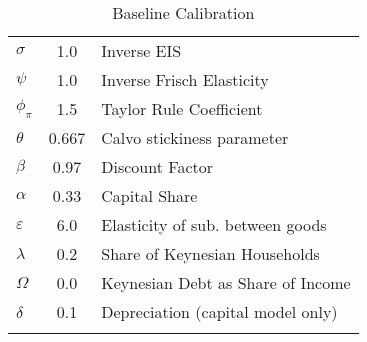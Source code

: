   \begin{table}
\begin{center}
    \caption{Baseline Calibration}\label{table:calibration}
\begin{tabular}{lcl}  
\\ \toprule  
$\sigma$ & 1.0 & Inverse EIS \\ 
$\psi$ & 1.0 & Inverse Frisch Elasticity \\ 
$\phi_{\pi}$ & 1.5 & Taylor Rule Coefficient \\ 
$\theta$ & 0.667 & Calvo stickiness parameter \\ 
$\beta$ & 0.97 &  Discount Factor\\ 
$\alpha$ & 0.33 &  Capital Share \\ 
$\varepsilon$ & 6.0 &  Elasticity of sub. between goods\\ 
$\lambda$ & 0.2 & Share of Keynesian Households \\ 
$\Omega$ & 0.0 & Keynesian Debt as Share of Income \\ 
$\delta$ & 0.1 & Depreciation (capital model only) \\ 
\\ \bottomrule 
 \end{tabular}
\end{center}
\end{table}

